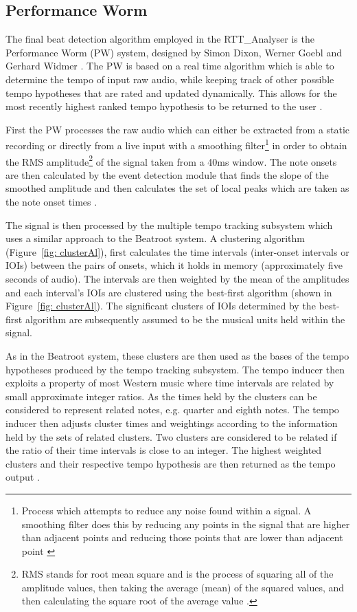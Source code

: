 \documentclass[a4paper, 11pt]{article}
\begin{document}
\subsection{Performance Worm}
The final beat detection algorithm employed in the RTT\_Analyser is the Performance Worm (PW) system, designed by Simon Dixon, Werner Goebl and Gerhard Widmer \cite{dixonGoeblWidmer}. The PW is based on a real time algorithm which is able to determine the tempo of input raw audio, while keeping track of other possible tempo hypotheses that are rated and updated dynamically. This allows for the most recently highest ranked tempo hypothesis to be returned to the user \cite{dixonGoeblWidmer}. 

First the PW processes the raw audio which can either be extracted from a static recording or directly from a live input with a smoothing filter\footnote{Process which attempts to reduce any noise found within a signal. A smoothing filter does this by reducing any points in the signal that are higher than adjacent points and reducing those points that are lower than adjacent point \cite{pragmaticSig}} in order to obtain the RMS amplitude\footnote{RMS stands for root mean square and is the process of squaring all of the amplitude values, then taking the average (mean) of the squared values, and then calculating the square root of the average value \cite{rms}.} of the signal taken from a 40ms window. The note onsets are then calculated by the event detection module that finds the slope of the smoothed amplitude and then calculates the set of local peaks which are taken as the note onset times \cite{dixonGoeblWidmer}. 

The signal is then processed by the multiple tempo tracking subsystem which uses a similar approach to the Beatroot system. A clustering algorithm (Figure~\ref{fig: clusterAl}), first calculates the time intervals (inter-onset intervals or IOIs) between the pairs of onsets, which it holds in memory (approximately five seconds of audio). The intervals are then weighted by the mean of the amplitudes and each interval's IOIs are clustered using the best-first algorithm (shown in Figure~\ref{fig: clusterAl}). The significant clusters of IOIs determined by the best-first algorithm are subsequently assumed to be the musical units held within the signal. 

As in the Beatroot system, these clusters are then used as the bases of the tempo hypotheses produced by the tempo tracking subsystem. The tempo inducer then exploits a property of most Western music where time intervals are related by small approximate integer ratios. As the times held by the clusters can be considered to represent related notes, e.g. quarter and eighth notes. The tempo inducer then adjusts cluster times and weightings according to the information held by the sets of related clusters. Two clusters are considered to be related if the ratio of their time intervals is close to an integer. The highest weighted clusters and their respective tempo hypothesis are then returned as the tempo output \cite{dixonGoeblWidmer}.
\end{document}
